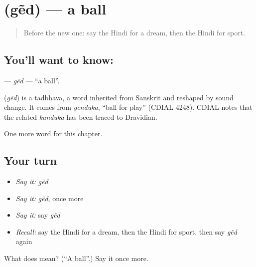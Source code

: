 \section[\texorpdfstring{\hi{गेंद} (gẽd)}{गेंद (gẽd)}]{ (gẽd) — a ball}

\label{lesson:HI-C223-ged}



\begin{quote}
Before the new one: say the Hindi for a dream, then the Hindi for sport.
\end{quote}

\subsection*{You'll want to know: }
\textbf{} — \emph{gẽd} — \textquotedblleft{}a ball\textquotedblright{}.

\begin{cousinweb}
\textbf{} (\emph{gẽd}) is a tadbhava, a word inherited from Sanskrit and reshaped by sound change. It comes from \emph{genduka}, \textquotedblleft{}ball for play\textquotedblright{} (CDIAL 4248). CDIAL notes that the related \emph{kanduka} has been traced to Dravidian.
\end{cousinweb}

\begin{grammarlens}[title={What you've built}]
One more word for this chapter.
\end{grammarlens}

\subsection*{Your turn}
\begin{itemize}
\raggedright
  \item \emph{Say it:} \emph{gẽd}
  \item \emph{Say it:} \emph{gẽd}, once more
  \item \emph{Say it:} say \emph{gẽd}
  \item \emph{Recall:} say the Hindi for a dream, then the Hindi for sport, then say \emph{gẽd} again
\end{itemize}

\begin{tcolorbox}[breakable,colback=teal!4,colframe=teal!35!black,title={Before you move on}]
What does  mean? (\textquotedblleft{}A ball\textquotedblright{}.) Say it once more.
\end{tcolorbox}
